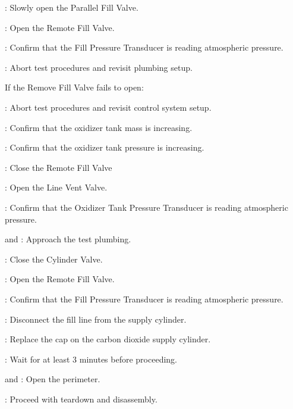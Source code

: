 \begin{checklist}
\begin{checklist}[label=$\bullet$]
\begin{checklist}
            \item \primary{}: Slowly open the Parallel Fill Valve.
            \item \primary{}: Open the Remote Fill Valve.
            \item \daq{}: Confirm that the Fill Pressure Transducer is reading atmospheric pressure.
            \item \ops{}: Abort test procedures and revisit plumbing setup.
        \end{checklist}
        \item If the Remove Fill Valve fails to open:
        \begin{checklist}
            \item \ops{}: Abort test procedures and revisit control system setup.
        \end{checklist}
    \end{checklist}
    \item \daq: Confirm that the oxidizer tank mass is increasing.
    \item \daq: Confirm that the oxidizer tank pressure is increasing.
    \item \primary: Close the Remote Fill Valve
    \item \primary{}: Open the Line Vent Valve.
    \item \daq{}: Confirm that the Oxidizer Tank Pressure Transducer is reading atmospheric pressure.
    \item \primary{} and \secondary: Approach the test plumbing.
    \item \primary{}: Close the Cylinder Valve.
    \item \primary{}: Open the Remote Fill Valve.
    \item \daq{}: Confirm that the Fill Pressure Transducer is reading atmospheric pressure.
    \item \primary{}: Disconnect the fill line from the supply cylinder.
    \item \primary{}: Replace the cap on the carbon dioxide supply cylinder.
    \item \ops{}: Wait for at least 3 minutes before proceeding.
    \item \peri{} and \perii{}: Open the perimeter.
    \item \ops{}: Proceed with teardown and disassembly. 
\end{checklist}
\setcounter{checklistnum}{0}
\newpage

